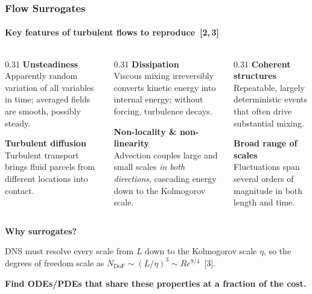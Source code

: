 
\begin{frame}
	\frametitle{Flow Surrogates}
	\framesubtitle{Key features of turbulent flows to reproduce~[2,\,3]}

	\small
	\begin{columns}[T]
		\begin{column}{0.31\linewidth}
			\textbf{Unsteadiness}\\
			Apparently random variation of all variables in time; averaged fields are smooth, possibly steady.

			\textbf{Turbulent diffusion}\\
			Turbulent transport brings fluid parcels from different locations into contact.
		\end{column}
		\begin{column}{0.31\linewidth}
			\textbf{Dissipation}\\
			Viscous mixing irreversibly converts kinetic energy into internal energy; without forcing, turbulence decays.

			\textbf{Non-locality \& non-linearity}\\
			Advection couples large and small scales \emph{in both directions}, cascading energy down to the Kolmogorov scale.
		\end{column}
		\begin{column}{0.31\linewidth}
			\textbf{Coherent structures}\\
			Repeatable, largely deterministic events that often drive substantial mixing.

			\textbf{Broad range of scales}\\
			Fluctuations span several orders of magnitude in both length and time.
		\end{column}
	\end{columns}

	\vfill
	\begingroup
		\setlength{\fboxsep}{6pt}
		\colorbox{ICLLightGrey}{%
			\parbox{\dimexpr\linewidth-2\fboxsep\relax}{%
				\textbf{Why surrogates?} 
                
                DNS must resolve every scale from $L$ down to the Kolmogorov scale $\eta$, so the degrees of freedom scale as $N_{\text{DoF}} \sim (L/\eta)^{3} \sim Re^{9/4}$~[3].

                
                \textbf{Find ODEs/PDEs that share these properties at a fraction of the cost.}
			}%
		}
	\endgroup
\end{frame}